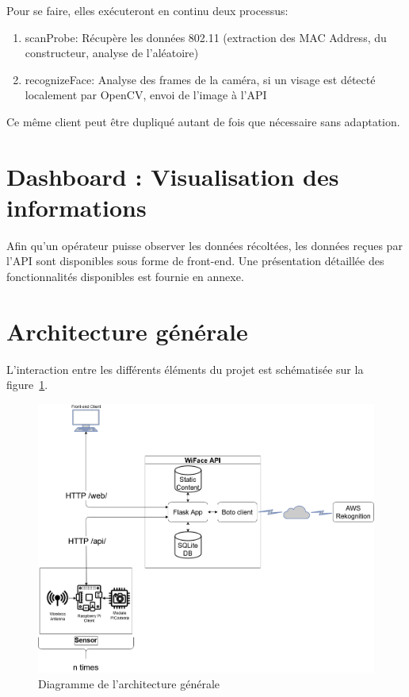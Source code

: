 Pour se faire, elles exécuteront en continu deux processus:
\begin{enumerate}
	\item scanProbe: Récupère les données 802.11 (extraction des MAC Address, du constructeur, analyse de l'aléatoire)
	\item recognizeFace: Analyse des frames de la caméra, si un visage est détecté localement par OpenCV, envoi de l'image à l'API
\end{enumerate}

Ce même client peut être dupliqué autant de fois que nécessaire sans adaptation. 

\section{Dashboard : Visualisation des informations}
Afin qu'un opérateur puisse observer les données récoltées, les données reçues par l'API sont disponibles sous forme de front-end.
Une présentation détaillée des fonctionnalités disponibles est fournie en annexe.

\section{Architecture générale}

L'interaction entre les différents éléments du projet est schématisée sur
la figure~\ref{fig:diag_archi}.

\begin{figure}[H]
	\centering
	\includegraphics[width=16cm]{images/conception/diagram_archi.png}
	\caption{Diagramme de l'architecture générale}
	\label{fig:diag_archi}
\end{figure}

